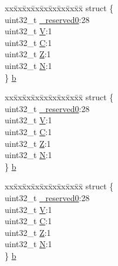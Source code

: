 \begin{DoxyCompactItemize}
\begin{tabbing}
\end{tabbing}\item 
\begin{tabbing}
xx\=xx\=xx\=xx\=xx\=xx\=xx\=xx\=xx\=\kill
struct \{\\
\>uint32\_t \mbox{\hyperlink{union_a_p_s_r___type_afbce95646fd514c10aa85ec0a33db728}{\_reserved0}}:28\\
\>uint32\_t \mbox{\hyperlink{union_a_p_s_r___type_a8004d224aacb78ca37774c35f9156e7e}{V}}:1\\
\>uint32\_t \mbox{\hyperlink{union_a_p_s_r___type_a86e2c5b891ecef1ab55b1edac0da79a6}{C}}:1\\
\>uint32\_t \mbox{\hyperlink{union_a_p_s_r___type_a3b04d58738b66a28ff13f23d8b0ba7e5}{Z}}:1\\
\>uint32\_t \mbox{\hyperlink{union_a_p_s_r___type_a7e7bbba9b00b0bb3283dc07f1abe37e0}{N}}:1\\
\} \mbox{\hyperlink{union_a_p_s_r___type_ad6830b9357a92992d38548e1cfd4d7f3}{b}}\\

\end{tabbing}\item 
\begin{tabbing}
xx\=xx\=xx\=xx\=xx\=xx\=xx\=xx\=xx\=\kill
struct \{\\
\>uint32\_t \mbox{\hyperlink{union_a_p_s_r___type_afbce95646fd514c10aa85ec0a33db728}{\_reserved0}}:28\\
\>uint32\_t \mbox{\hyperlink{union_a_p_s_r___type_a8004d224aacb78ca37774c35f9156e7e}{V}}:1\\
\>uint32\_t \mbox{\hyperlink{union_a_p_s_r___type_a86e2c5b891ecef1ab55b1edac0da79a6}{C}}:1\\
\>uint32\_t \mbox{\hyperlink{union_a_p_s_r___type_a3b04d58738b66a28ff13f23d8b0ba7e5}{Z}}:1\\
\>uint32\_t \mbox{\hyperlink{union_a_p_s_r___type_a7e7bbba9b00b0bb3283dc07f1abe37e0}{N}}:1\\
\} \mbox{\hyperlink{union_a_p_s_r___type_a57fde0b8cbbaaba67bf0fbac8a235126}{b}}\\

\end{tabbing}\item 
\begin{tabbing}
xx\=xx\=xx\=xx\=xx\=xx\=xx\=xx\=xx\=\kill
struct \{\\
\>uint32\_t \mbox{\hyperlink{union_a_p_s_r___type_afbce95646fd514c10aa85ec0a33db728}{\_reserved0}}:28\\
\>uint32\_t \mbox{\hyperlink{union_a_p_s_r___type_a8004d224aacb78ca37774c35f9156e7e}{V}}:1\\
\>uint32\_t \mbox{\hyperlink{union_a_p_s_r___type_a86e2c5b891ecef1ab55b1edac0da79a6}{C}}:1\\
\>uint32\_t \mbox{\hyperlink{union_a_p_s_r___type_a3b04d58738b66a28ff13f23d8b0ba7e5}{Z}}:1\\
\>uint32\_t \mbox{\hyperlink{union_a_p_s_r___type_a7e7bbba9b00b0bb3283dc07f1abe37e0}{N}}:1\\
\} \mbox{\hyperlink{union_a_p_s_r___type_acb547d8b76d2f9ed5c35aec568cf2e55}{b}}\\


\end{tabbing}
\end{DoxyCompactItemize}
